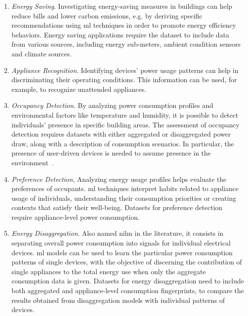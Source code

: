 \newpage

\begin{enumerate}[label={\textit{A\arabic*.}}, leftmargin=3.5em]
    \item \textit{Energy Saving}. Investigating energy-saving measures in buildings can help reduce bills and lower carbon emissions, e.g. by deriving specific recommendations using \acrfull{ml} techniques in order to promote energy efficiency behaviors. Energy saving applications require the dataset to include data from various sources, including energy sub-meters, ambient condition sensors and climate sources.

    \item \textit{Appliance Recognition}. Identifying devices' power usage patterns can help in discriminating their operating conditions. This information can be used, for example, to recognize unattended appliances.

    \item \textit{Occupancy Detection}. By analyzing power consumption profiles and environmental factors like temperature and humidity, it is possible to detect individuals' presence in specific building areas. The assessment of occupancy detection requires datasets with either aggregated or disaggregated power draw, along with a description of consumption scenarios. In particular, the presence of user-driven devices is needed to assume presence in the environment~\parencite{monacchiGREENDEnergyConsumption2014}.

    \item \textit{Preference Detection}, Analyzing energy usage profiles helps evaluate the preferences of occupants. \acrshort{ml} techniques interpret habits related to appliance usage of individuals, understanding their consumption priorities or creating contexts that satisfy their well-being. Datasets for preference detection require appliance-level power consumption.

    \item \textit{Energy Disaggregation}. Also named \acrfull{nilm} in the literature, it consists in separating overall power consumption into signals for individual electrical devices. \acrshort{ml} models can be used to learn the particular power consumption patterns of single devices, with the objective of discerning the contribution of single appliances to the total energy use when only the aggregate consumption data is given. Datasets for energy disaggregation need to include both aggregated and appliance-level consumption fingerprints, to compare the results obtained from disaggregation models with individual patterns of devices.


\end{enumerate}
